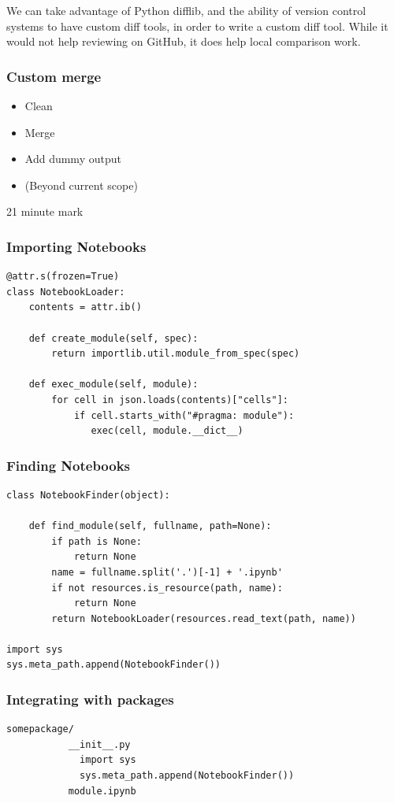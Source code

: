 We can take advantage of Python difflib,
and the ability of version control systems to
have custom diff tools,
in order to write a custom diff tool.
While it would not help reviewing on GitHub,
it does help local comparison work.

\begin{frame}
\frametitle{Custom merge}

\begin{itemize}
\item Clean
\item Merge
\item Add dummy output
\item (Beyond current scope)
\end{itemize}

\end{frame}


21 minute mark

\begin{frame}[fragile]
\frametitle{Importing Notebooks}

\begin{lstlisting}
@attr.s(frozen=True)
class NotebookLoader:
    contents = attr.ib()

    def create_module(self, spec):
        return importlib.util.module_from_spec(spec)

    def exec_module(self, module):
        for cell in json.loads(contents)["cells"]:
            if cell.starts_with("#pragma: module"):
               exec(cell, module.__dict__)
\end{lstlisting}

\end{frame}

\begin{frame}[fragile]
\frametitle{Finding Notebooks}

\begin{lstlisting}
class NotebookFinder(object):
 
    def find_module(self, fullname, path=None):
        if path is None:
            return None
        name = fullname.split('.')[-1] + '.ipynb'
        if not resources.is_resource(path, name):
            return None
        return NotebookLoader(resources.read_text(path, name))

import sys
sys.meta_path.append(NotebookFinder())
\end{lstlisting}

\end{frame}

\begin{frame}[fragile]
\frametitle{Integrating with packages}

\begin{lstlisting}
somepackage/
           __init__.py
             import sys
             sys.meta_path.append(NotebookFinder())
           module.ipynb
\end{lstlisting}

\end{frame}


